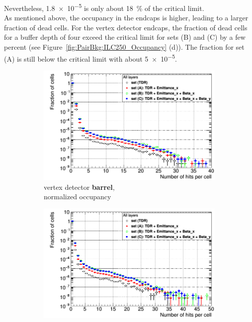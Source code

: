 Nevertheless, \num{1.8e-5} is only about \SI{18}{\percent} of the critical limit.
\\As mentioned above, the occupancy in the endcaps is higher, leading to a larger fraction of dead cells.
For the vertex detector endcaps, the fraction of dead cells for a buffer depth of four exceed the critical limit for sets (B) and (C) by a few percent (see Figure~\ref{fig:PairBkg:ILC250_Occupancy} (d)).
The fraction for set (A) is still below the critical limit with about \num{5e-5}.\\
 \begin{figure}
 \captionsetup[subfigure]{justification=centering}
 \centering
  \begin{subfigure}[b]{0.49\textwidth}
   \centering
    \includegraphics[width=\textwidth]{Figures/Pairs/Occupancy_Comparison_All_layers_wrt_cells_ILC250_ALL_SETS_SiVertexBarrel_corrected_Barrel_size.png}
   \caption{\sid vertex detector \textbf{barrel},\\normalized occupancy}
   \end{subfigure}
   \hfill
   \begin{subfigure}[b]{0.49\textwidth}
   \centering
    \includegraphics[width=\textwidth]{Figures/Pairs/Occupancy_Comparison_All_layers_wrt_cells_ILC250_ALL_SETS_5T_w_antiDiD_SiVertexEndcap.png}

\end{subfigure}
\end{figure}
